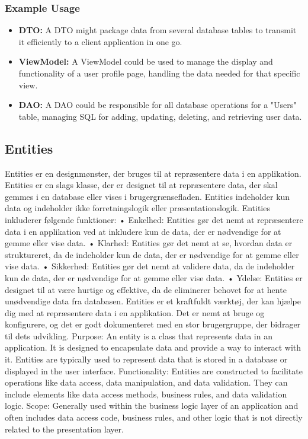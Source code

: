 \subsubsection{Example Usage}
\begin{itemize}
    \item \textbf{DTO:} A DTO might package data from several database tables to transmit it efficiently to a client application in one go.
    \item \textbf{ViewModel:} A ViewModel could be used to manage the display and functionality of a user profile page, handling the data needed for that specific view.
    \item \textbf{DAO:} A DAO could be responsible for all database operations for a "Users" table, managing SQL for adding, updating, deleting, and retrieving user data.
\end{itemize}

\subsection{Entities}
Entities er en designmønster, der bruges til at repræsentere data i en applikation. Entities er en slags klasse, der er designet til at repræsentere data, der skal gemmes i en database eller vises i brugergrænsefladen. Entities indeholder kun data og indeholder ikke forretningslogik eller præsentationslogik.
Entities inkluderer følgende funktioner:
•	Enkelhed: Entities gør det nemt at repræsentere data i en applikation ved at inkludere kun de data, der er nødvendige for at gemme eller vise data.
•	Klarhed: Entities gør det nemt at se, hvordan data er struktureret, da de indeholder kun de data, der er nødvendige for at gemme eller vise data.
•	Sikkerhed: Entities gør det nemt at validere data, da de indeholder kun de data, der er nødvendige for at gemme eller vise data.
•	Ydelse: Entities er designet til at være hurtige og effektive, da de eliminerer behovet for at hente unødvendige data fra databasen.
Entities er et kraftfuldt værktøj, der kan hjælpe dig med at repræsentere data i en applikation. Det er nemt at bruge og konfigurere, og det er godt dokumenteret med en stor brugergruppe, der bidrager til dets udvikling.
Purpose: An entity is a class that represents data in an application. It is designed to encapsulate data and provide a way to interact with it. Entities are typically used to represent data that is stored in a database or displayed in the user interface.
Functionality: Entities are constructed to facilitate operations like data access, data manipulation, and data validation. They can include elements like data access methods, business rules, and data validation logic.
Scope: Generally used within the business logic layer of an application and often includes data access code, business rules, and other logic that is not directly related to the presentation layer.

